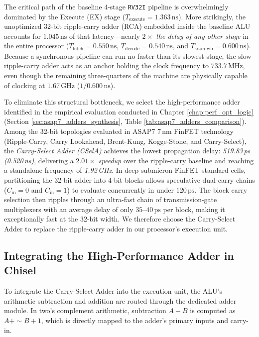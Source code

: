 The critical path of the baseline 4-stage \texttt{RV32I} pipeline is overwhelmingly dominated by the Execute (EX) stage ($T_{\text{execute}} = 1.363\,\text{ns}$). More strikingly, the unoptimized 32-bit ripple-carry adder (RCA) embedded inside the baseline ALU accounts for $1.045\,\text{ns}$ of that latency---nearly \textit{$2\times$ the delay of any other stage} in the entire processor ($T_{\text{fetch}} = 0.550\,\text{ns}$, $T_{\text{decode}} = 0.540\,\text{ns}$, and $T_{\text{sram\_wb}} = 0.600\,\text{ns}$). Because a synchronous pipeline can run no faster than its slowest stage, the slow ripple-carry adder acts as an anchor holding the clock frequency to $733.7\,\text{MHz}$, even though the remaining three-quarters of the machine are physically capable of clocking at $1.67\,\text{GHz}$ ($1 / 0.600\,\text{ns}$).

To eliminate this structural bottleneck, we select the high-performance adder identified in the empirical evaluation conducted in Chapter \ref{chap:perf_opt_logic} (Section \ref{sec:asap7_adders_synthesis}, Table \ref{tab:asap7_adders_comparison}). Among the 32-bit topologies evaluated in ASAP7 7\,nm FinFET technology (Ripple-Carry, Carry Lookahead, Brent-Kung, Kogge-Stone, and Carry-Select), the \textit{Carry-Select Adder (CSelA)} achieves the lowest propagation delay: \textit{519.83\,ps (0.520\,ns)}, delivering a \textit{$2.01\times$ speedup} over the ripple-carry baseline and reaching a standalone frequency of \textit{1.92\,GHz}. In deep-submicron FinFET standard cells, partitioning the 32-bit adder into 4-bit blocks allows speculative dual-carry chains ($C_{\text{in}} = 0$ and $C_{\text{in}} = 1$) to evaluate concurrently in under $120\,\text{ps}$. The block carry selection then ripples through an ultra-fast chain of transmission-gate multiplexers with an average delay of only $35\text{--}40\,\text{ps}$ per block, making it exceptionally fast at the 32-bit width. We therefore choose the Carry-Select Adder to replace the ripple-carry adder in our processor's execution unit.

\subsection{Integrating the High-Performance Adder in Chisel}

To integrate the Carry-Select Adder into the execution unit, the ALU's arithmetic subtraction and addition are routed through the dedicated adder module. In two's complement arithmetic, subtraction $A - B$ is computed as $A + \sim B + 1$, which is directly mapped to the adder's primary inputs and carry-in. 

